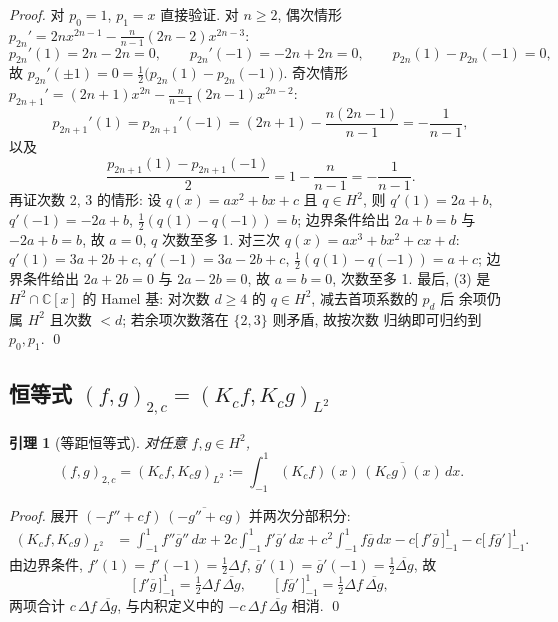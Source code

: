\documentclass[UTF8]{ctexart}
\newtheorem{lemma}[theorem]{引理}
\begin{document}
\begin{proof}
对 $p_0 = 1$, $p_1 = x$ 直接验证. 对 $n \geq 2$, 偶次情形
$p_{2n}' = 2n x^{2n-1} - \frac{n}{n-1}(2n-2) x^{2n-3}$:
\[
	p_{2n}'(1) = 2n - 2n = 0, \qquad
	p_{2n}'(-1) = -2n + 2n = 0, \qquad
	p_{2n}(1) - p_{2n}(-1) = 0,
\]
故 $p_{2n}'(\pm1) = 0 = \tfrac{1}{2}\bigl(p_{2n}(1)-p_{2n}(-1)\bigr)$. 奇次情形
$p_{2n+1}' = (2n+1) x^{2n} - \frac{n}{n-1}(2n-1) x^{2n-2}$:
\[
	p_{2n+1}'(1) = p_{2n+1}'(-1) = (2n+1) - \frac{n(2n-1)}{n-1} = -\frac{1}{n-1},
\]
以及
\[
	\frac{p_{2n+1}(1)-p_{2n+1}(-1)}{2} = 1 - \frac{n}{n-1} = -\frac{1}{n-1}.
\]
再证次数 2, 3 的情形: 设 $q(x) = ax^2 + bx + c$ 且 $q \in H^2$, 则
$q'(1) = 2a+b$, $q'(-1) = -2a+b$, $\tfrac12(q(1)-q(-1)) = b$; 边界条件给出
$2a + b = b$ 与 $-2a + b = b$, 故 $a = 0$, $q$ 次数至多 1. 对三次
$q(x) = ax^3 + bx^2 + cx + d$: $q'(1) = 3a+2b+c$, $q'(-1) = 3a-2b+c$,
$\tfrac12(q(1)-q(-1)) = a+c$; 边界条件给出 $2a+2b = 0$ 与 $2a-2b = 0$,
故 $a = b = 0$, 次数至多 1. 最后, (3) 是 $H^2 \cap \mathbb{C}[x]$
的 Hamel 基: 对次数 $d \geq 4$ 的 $q \in H^2$, 减去首项系数的 $p_d$ 后
余项仍属 $H^2$ 且次数 $< d$; 若余项次数落在 $\{2,3\}$ 则矛盾, 故按次数
归纳即可归约到 $p_0, p_1$. \qed
\end{proof}

\subsection{恒等式 \texorpdfstring{$(f,g)_{2,c} = (K_c f, K_c g)_{L^2}$}{(f,g)=(Kf,Kg)}}

\begin{lemma}[等距恒等式]
对任意 $f, g \in H^2$,
\begin{equation}
	(f, g)_{2,c} = (K_c f, K_c g)_{L^2} := \int_{-1}^{1} (K_c f)(x)\, \overline{(K_c g)(x)}\, dx.
\end{equation}
\end{lemma}

\begin{proof}
展开 $(-f'' + cf)\,\overline{(-g'' + cg)}$ 并两次分部积分:
\begin{align*}
	(K_c f, K_c g)_{L^2}
	&= \int_{-1}^1 f''\overline{g}''\, dx
		+ 2c \int_{-1}^1 f'\overline{g}'\, dx
		+ c^2 \int_{-1}^1 f\overline{g}\, dx
		- c \bigl[\, f'\overline{g} \,\bigr]_{-1}^{1}
		- c \bigl[\, f\overline{g}' \,\bigr]_{-1}^{1}.
\end{align*}
由边界条件, $f'(1) = f'(-1) = \tfrac12\Delta f$, $\overline{g}'(1) = \overline{g}'(-1) = \tfrac12\overline{\Delta g}$,
故
\[
	\bigl[\, f'\overline{g} \,\bigr]_{-1}^{1} =
	\tfrac12 \Delta f\, \overline{\Delta g}, \qquad
	\bigl[\, f\overline{g}' \,\bigr]_{-1}^{1} =
	\tfrac12 \Delta f\, \overline{\Delta g},
\]
两项合计 $c\,\Delta f\, \overline{\Delta g}$, 与内积定义中的
$-c\,\Delta f\, \overline{\Delta g}$ 相消. \qed
\end{proof}
\end{document}
